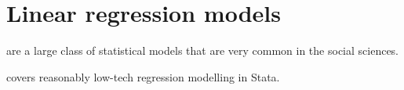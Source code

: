 \chapter[Linear models]{Linear regression models}%
	\label{ch:lin}

	 are a large class of statistical models that are very common in the social sciences.%

	 covers reasonably low-tech regression modelling in Stata.%
